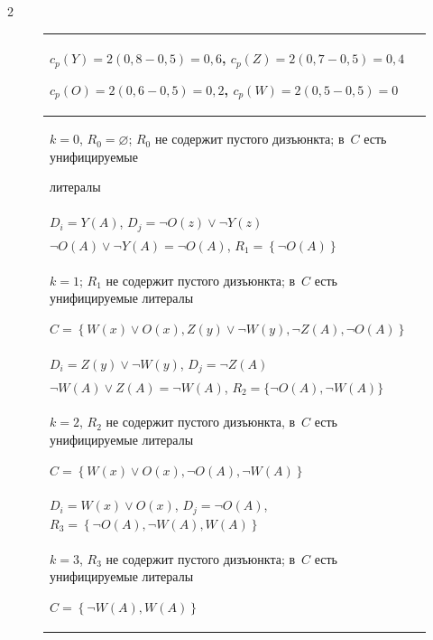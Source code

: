 \begin{multicols}{2}
\begin{figure}[b]
\begin{center}
{\begin{tabular}{|p{124mm}|}
$c_p(Y)=2(0{,}8-0{,}5) =0{,}6$, $c_p(Z)=2(0{,}7- 0{,}5)=0{,}4$\newline


$c_p(O)=2(0{,}6-0{,}5)=0{,}2$, $c_p(W)= 2(0{,}5-0{,}5)=0$\\


\hline


$k=0$, $R_0=\varnothing$; $R_0$ не содержит пустого дизъюнкта; в~$C$ есть унифицируемые 


литералы\\


\hline


$D_i=Y(A)$, $D_j=\neg O(z)\vee \neg Y(z)$ \\


\hline


$\neg O(A)\vee \neg Y(A)=\neg O(A)$, $R_1=\left\{ \neg O(A)\right\}$\\


\hline


$k=1$; $R_1$ не содержит пустого дизъюнкта; в~$C$ есть унифицируемые литералы\newline


$C=\left\{ W(x)\vee O(x), Z(y)\vee \neg W(y), \neg Z(A), \neg O(A)\right\}$\\


\hline


$D_i=Z(y)\vee \neg W(y)$, $D_j=\neg Z(A)$ \\


\hline


$\neg W(A)\vee Z(A) =\neg W(A)$, $R_2=\{ \neg O(A), \neg W(A)\}$ \\


\hline


$k=2$, $R_2$ не содержит пустого дизъюнкта, в~$C$ есть унифицируемые литералы\newline


$C=\left\{ W(x)\vee O(x), \neg O(A), \neg W(A)\right\}$\\


\hline


$D_i=W(x)\vee O(x)$, $D_j=\neg O(A)$, $R_3=\left\{ \neg O(A), \neg W(A), W(A)\right\}$\\


\hline


$k=3$, $R_3$ не содержит пустого дизъюнкта; в~$C$ есть унифицируемые литералы\newline


$C=\left\{ \neg W(A), W(A)\right\}$\\



\end{tabular}}
\end{center}
\end{figure}
\end{multicols}
